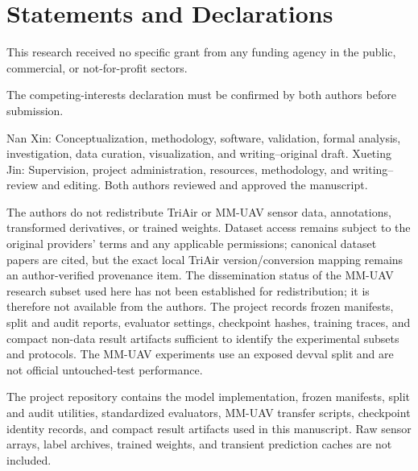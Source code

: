 \section*{Statements and Declarations}
This research received no specific grant from any funding agency in the public, commercial, or not-for-profit sectors.

The competing-interests declaration must be confirmed by both authors before submission.

Nan Xin: Conceptualization, methodology, software, validation, formal analysis, investigation, data curation, visualization, and writing--original draft. Xueting Jin: Supervision, project administration, resources, methodology, and writing--review and editing. Both authors reviewed and approved the manuscript.

The authors do not redistribute TriAir or MM-UAV sensor data, annotations, transformed derivatives, or trained weights. Dataset access remains subject to the original providers' terms and any applicable permissions; canonical dataset papers are cited, but the exact local TriAir version/conversion mapping remains an author-verified provenance item. The dissemination status of the MM-UAV research subset used here has not been established for redistribution; it is therefore not available from the authors. The project records frozen manifests, split and audit reports, evaluator settings, checkpoint hashes, training traces, and compact non-data result artifacts sufficient to identify the experimental subsets and protocols. The MM-UAV experiments use an exposed devval split and are not official untouched-test performance.

The project repository contains the model implementation, frozen manifests, split and audit utilities, standardized evaluators, MM-UAV transfer scripts, checkpoint identity records, and compact result artifacts used in this manuscript. Raw sensor arrays, label archives, trained weights, and transient prediction caches are not included.

